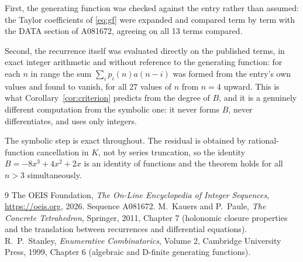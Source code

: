 \documentclass[11pt,a4paper]{article}
\theoremstyle{plain}
\theoremstyle{definition}
\begin{document}
First, the generating function was checked against the entry rather than assumed: the
Taylor coefficients of \eqref{eq:gf} were expanded and compared term by term with the DATA
section of A081672, agreeing on all 13 terms compared.

Second, the recurrence itself was evaluated directly on the published terms, in exact
integer arithmetic and without reference to the generating function: for each $n$ in range
the sum $\sum_{i}p_{i}(n)a(n-i)$ was formed from the entry's own values and found to
vanish, for all 27 values of $n$ from $n=4$ upward. This is what
Corollary~\ref{cor:criterion} predicts from the degree of $B$, and it is a genuinely
different computation from the symbolic one: it never forms $B$, never differentiates, and
uses only integers.

The symbolic step is exact throughout. The residual is obtained by rational-function
cancellation in $K$, not by series truncation, so the identity $B=- 8 x^{3} + 4 x^{2} + 2 x$ is an
identity of functions and the theorem holds for all $n>3$ simultaneously.

\begin{thebibliography}{9}
 The OEIS Foundation, \emph{The On-Line Encyclopedia of Integer Sequences},
\url{https://oeis.org}, 2026. Sequence A081672.
 M.~Kauers and P.~Paule, \emph{The Concrete Tetrahedron}, Springer, 2011,
Chapter 7 (holonomic closure properties and the translation between recurrences and
differential equations).
 R.~P.~Stanley, \emph{Enumerative Combinatorics}, Volume 2, Cambridge
University Press, 1999, Chapter 6 (algebraic and D-finite generating functions).
\end{thebibliography}
\end{document}
